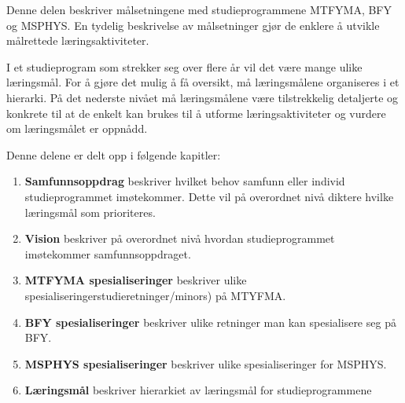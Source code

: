 Denne delen beskriver målsetningene med studieprogrammene MTFYMA, BFY og MSPHYS. 
En tydelig beskrivelse av målsetninger gjør de enklere å utvikle målrettede læringsaktiviteter.

I et studieprogram som strekker seg over flere år vil det være mange ulike læringsmål. For å gjøre det mulig å få oversikt, må læringsmålene organiseres i et hierarki. 
På det nederste nivået må læringsmålene være tilstrekkelig detaljerte og konkrete til at de enkelt kan brukes til å utforme læringsaktiviteter og vurdere om læringsmålet er oppnådd.

Denne delene er delt opp i følgende kapitler:

\begin{enumerate}
   \item \textbf{Samfunnsoppdrag} beskriver hvilket behov samfunn eller individ studieprogrammet imøtekommer. Dette vil på overordnet nivå diktere hvilke læringsmål som prioriteres.
   \item \textbf{Vision} beskriver på overordnet nivå hvordan studieprogrammet imøtekommer samfunnsoppdraget.
   \item \textbf{MTFYMA spesialiseringer} beskriver ulike spesialiseringerstudieretninger/minors) på MTYFMA.
   \item \textbf{BFY spesialiseringer} beskriver ulike retninger man kan spesialisere seg på BFY.
   \item \textbf{MSPHYS spesialiseringer} beskriver ulike spesialiseringer for MSPHYS.
   \item \textbf{Læringsmål} beskriver hierarkiet av læringsmål for studieprogrammene
\end{enumerate}